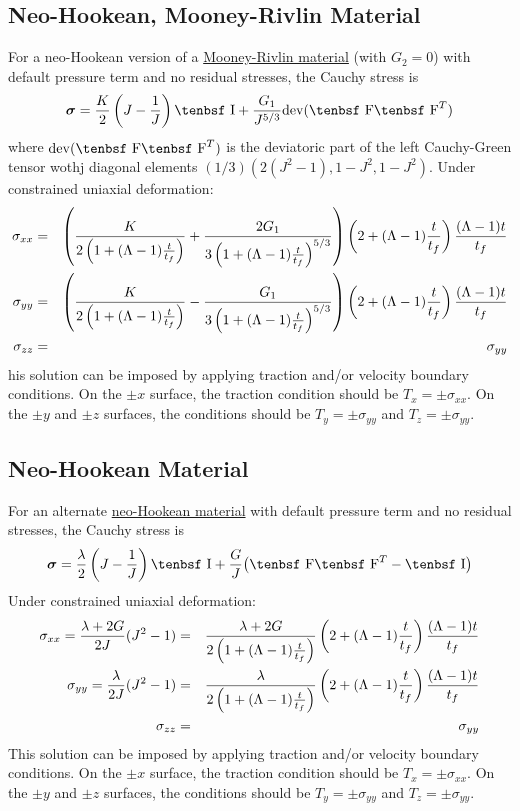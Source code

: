 \documentclass[11pt]{book}
\newcommand{\tens}[1]{\boldsymbol{\mathsf{#1}}}
\def\F{\hbox{\tenbsf F}}
\def\I{\hbox{\tenbsf I}}
\begin{document}
\subsection{Neo-Hookean, Mooney-Rivlin Material}

For a neo-Hookean version of a \hyperref[MRM]{Mooney-Rivlin material} (with $G_2=0$) with default pressure term and no residual stresses, the Cauchy stress is
\begin{equation}
     \tens\sigma = {K\over 2}\left(J - {1\over J}\right)\I + {G_1\over J^{5/3}}{\rm dev}(\F \F^T)
\end{equation}
where ${\rm dev}(\F \F^T)$ is the deviatoric part of the left Cauchy-Green tensor wothj diagonal elements $(1/3)(2(J^2-1),1-J^2,1-J^2)$. Under constrained uniaxial deformation:
\begin{eqnarray}
   \sigma_{xx} & = & \left( {K\over 2\left(1 + (\Lambda-1){t\over t_f}\right)} +{2G_1\over 3\left(1 + (\Lambda-1){t\over t_f}\right)^{5/3}} \right)\left(2+ (\Lambda-1){t\over t_f}\right){ (\Lambda-1)t\over t_f} \\
   \sigma_{yy}  & = & \left( {K\over 2\left(1 + (\Lambda-1){t\over t_f}\right)} -{G_1\over 3\left(1 + (\Lambda-1){t\over t_f}\right)^{5/3}} \right) \left(2+ (\Lambda-1){t\over t_f}\right){(\Lambda-1)t\over t_f} \\
   \sigma_{zz} & = &  \sigma_{yy}
\end{eqnarray}
his solution can be imposed by applying traction and/or velocity boundary conditions. On the $\pm x$ surface, the traction condition should be $T_x = \pm \sigma_{xx}$. On the $\pm y$ and $\pm z$ surfaces, the conditions should be $T_y = \pm \sigma_{yy}$ and $T_z = \pm \sigma_{yy}$.

\subsection{Neo-Hookean Material}

For an alternate \hyperref[NHM]{neo-Hookean material} with default pressure term and no residual stresses, the Cauchy stress is
\begin{equation}
     \tens\sigma = {\lambda\over 2}\left(J - {1\over J}\right)\I + {G\over J}\bigl(\F \F^T - \I\bigr)
\end{equation}
Under constrained uniaxial deformation:
\begin{eqnarray}
   \sigma_{xx} = {\lambda+2G\over 2J}(J^2-1) & = &  {\lambda+2G\over 2\left(1 + (\Lambda-1){t\over t_f}\right)}\left(2+ (\Lambda-1){t\over t_f}\right){ (\Lambda-1)t\over t_f} \\
   \sigma_{yy}  = {\lambda\over 2J}(J^2-1) & = &  {\lambda\over 2\left(1 + (\Lambda-1){t\over t_f}\right)} \left(2+ (\Lambda-1){t\over t_f}\right){(\Lambda-1)t\over t_f} \\
   \sigma_{zz} & = &  \sigma_{yy}
\end{eqnarray}
This solution can be imposed by applying traction and/or velocity boundary conditions. On the $\pm x$ surface, the traction condition should be $T_x = \pm \sigma_{xx}$. On the $\pm y$ and $\pm z$ surfaces, the conditions should be $T_y = \pm \sigma_{yy}$ and $T_z = \pm \sigma_{yy}$.
\end{document}
